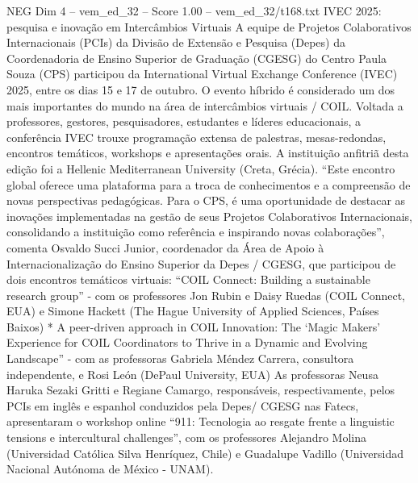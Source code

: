 \begin{textsample}{NEG Dim 4 – vem\_ed\_32 – Score 1.00 – vem\_ed\_32/t168.txt}  \label{ex:f4_neg_135}
IVEC 2025: pesquisa e inovação em Intercâmbios Virtuais A equipe de Projetos Colaborativos Internacionais (PCIs) da Divisão de Extensão e Pesquisa (Depes) da Coordenadoria de Ensino Superior de Graduação (CGESG) do Centro Paula Souza (CPS) participou da International Virtual Exchange Conference (IVEC) 2025, entre os dias 15 e 17 de outubro.
O evento híbrido é considerado um dos mais importantes do mundo na área de intercâmbios virtuais / COIL.
Voltada a professores, gestores, pesquisadores, estudantes e líderes educacionais, a conferência IVEC trouxe programação extensa de palestras, mesas-redondas, encontros temáticos, workshops e apresentações orais.
A instituição anfitriã desta edição foi a Hellenic Mediterranean University (Creta, Grécia). “Este encontro global oferece uma plataforma para a troca de conhecimentos e a compreensão de novas perspectivas pedagógicas.
Para o CPS, é uma oportunidade de destacar as inovações implementadas na gestão de seus Projetos Colaborativos Internacionais, consolidando a instituição como referência e inspirando novas colaborações”, comenta Osvaldo Succi Junior, coordenador da Área de Apoio à Internacionalização do Ensino Superior da Depes / CGESG, que participou de dois encontros temáticos virtuais: “COIL Connect: Building a sustainable research group” - com os professores Jon Rubin e Daisy Ruedas (COIL Connect, EUA) e Simone Hackett (The Hague University of Applied Sciences, Países Baixos) * A peer-driven approach in COIL Innovation: The ‘Magic Makers’ Experience for COIL Coordinators to Thrive in a Dynamic and Evolving Landscape” - com as professoras Gabriela Méndez Carrera, consultora independente, e Rosi León (DePaul University, EUA) As professoras Neusa Haruka Sezaki Gritti e Regiane Camargo, responsáveis, respectivamente, pelos PCIs em inglês e espanhol conduzidos pela Depes/ CGESG nas Fatecs, apresentaram o workshop online “911: Tecnologia ao resgate frente a linguistic tensions e intercultural challenges”, com os professores Alejandro Molina (Universidad Católica Silva Henríquez, Chile) e Guadalupe Vadillo (Universidad Nacional Autónoma de México - UNAM).

\end{textsample}
